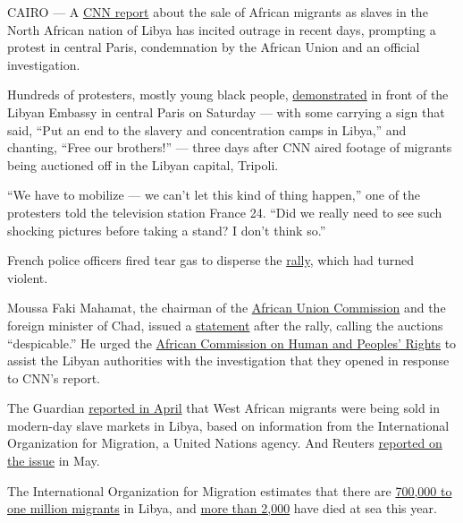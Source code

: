 CAIRO --- A
\href{http://edition.cnn.com/2017/11/14/africa/libya-migrant-auctions/index.html}{CNN
report} about the sale of African migrants as slaves in the North
African nation of Libya has incited outrage in recent days, prompting a
protest in central Paris, condemnation by the African Union and an
official investigation.

Hundreds of protesters, mostly young black people,
\href{https://twitter.com/RemyBuisine/status/931887038680522753}{demonstrated}
in front of the Libyan Embassy in central Paris on Saturday --- with
some carrying a sign that said, ``Put an end to the slavery and
concentration camps in Libya,'' and chanting, ``Free our brothers!'' ---
three days after CNN aired footage of migrants being auctioned off in
the Libyan capital, Tripoli.

``We have to mobilize --- we can't let this kind of thing happen,'' one
of the protesters told the television station France 24. ``Did we really
need to see such shocking pictures before taking a stand? I don't think
so.''

French police officers fired tear gas to disperse the
\href{http://www.lefigaro.fr/actualite-france/2017/11/19/01016-20171119ARTFIG00119-esclavage-en-libye-manifestation-a-paris-enquete-ouverte-a-tripoli.php}{rally},
which had turned violent.

Moussa Faki Mahamat, the chairman of the
\href{https://www.nytimes3xbfgragh.onion/topic/organization/african-union?inline=nyt-org}{African
Union Commission} and the foreign minister of Chad, issued a
\href{https://au.int/en/pressreleases/20171118/statement-chairperson-african-union-commission-plight-african-migrants-libya}{statement}
after the rally, calling the auctions ``despicable.'' He urged the
\href{http://www.achpr.org/}{African Commission on Human and Peoples'
Rights} to assist the Libyan authorities with the investigation that
they opened in response to CNN's report.

The Guardian
\href{https://www.theguardian.com/world/2017/apr/10/libya-public-slave-auctions-un-migration}{reported
in April} that West African migrants were being sold in modern-day slave
markets in Libya, based on information from the International
Organization for Migration, a United Nations agency. And Reuters
\href{https://www.reuters.com/article/us-libya-migrants-slavery/world-turns-blind-eye-to-libya-slave-trade-photographer-idUSKCN18D283}{reported
on the issue} in May.

The International Organization for Migration estimates that there are
\href{https://www.reuters.com/article/us-europe-migrants-iom-libya/eu-should-pay-more-to-return-african-migrants-home-from-libya-malta-says-idUSKBN1672CJ}{700,000
to one million migrants} in Libya, and
\href{https://www.nytimes3xbfgragh.onion/2017/07/27/world/europe/italy-plans-naval-mission-off-libya-to-stop-migrant-boats.html?rref=collection\%2Ftimestopic\%2FLibya\&action=click\&contentCollection=world\&region=stream\&module=stream_unit\&version=latest\&contentPlacement=9\&pgtype=collection}{more
than 2,000} have died at sea this year.

